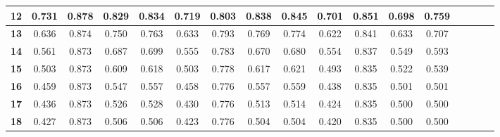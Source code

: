 \begin{table*}[!t]
\begin{tabular}{|c|c|c|c|c|c|c|c|c|c|c|c|c|c|c|c|c|}
\hline
\bfseries 12 & 0.731 & 0.878 & 0.829 & 0.834 & 0.719 & 0.803 & 0.838 & 0.845 & 0.701 & 0.851 & 0.698 & 0.759 \\
\hline
\bfseries 13 & 0.636 & 0.874 & 0.750 & 0.763 & 0.633 & 0.793 & 0.769 & 0.774 & 0.622 & 0.841 & 0.633 & 0.707 \\
\hline
\bfseries 14 & 0.561 & 0.873 & 0.687 & 0.699 & 0.555 & 0.783 & 0.670 & 0.680 & 0.554 & 0.837 & 0.549 & 0.593 \\
\hline
\bfseries 15 & 0.503 & 0.873 & 0.609 & 0.618 & 0.503 & 0.778 & 0.617 & 0.621 & 0.493 & 0.835 & 0.522 & 0.539 \\
\hline
\bfseries 16 & 0.459 & 0.873 & 0.547 & 0.557 & 0.458 & 0.776 & 0.557 & 0.559 & 0.438 & 0.835 & 0.501 & 0.501 \\
\hline
\bfseries 17 & 0.436 & 0.873 & 0.526 & 0.528 & 0.430 & 0.776 & 0.513 & 0.514 & 0.424 & 0.835 & 0.500 & 0.500 \\
\hline
\bfseries 18 & 0.427 & 0.873 & 0.506 & 0.506 & 0.423 & 0.776 & 0.504 & 0.504 & 0.420 & 0.835 & 0.500 & 0.500 \\
\hline
\end{tabular}
\end{table*}

